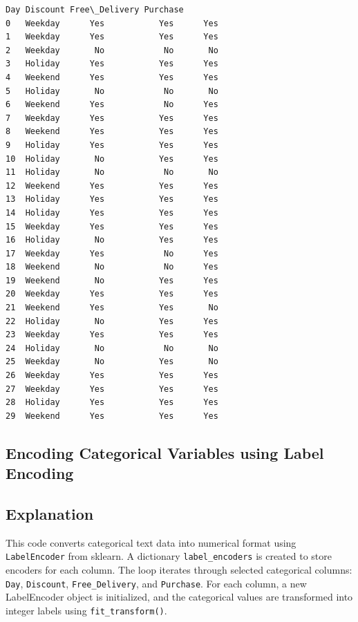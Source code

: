 \documentclass[11pt]{article}
\makeatletter
\newcommand{\boxspacing}{\kern\kvtcb@left@rule\kern\kvtcb@boxsep}
\newcommand{\prompt}[4]{
        {\ttfamily\llap{{\color{#2}[#3]:\hspace{3pt}#4}}\vspace{-\baselineskip}}
    }
\makeatother
\begin{document}
\begin{tcolorbox}[breakable, size=fbox, boxrule=.5pt, pad at break*=1mm, opacityfill=0]
\prompt{Out}{outcolor}{3}{\boxspacing}
\begin{Verbatim}[commandchars=\\\{\}]
        Day Discount Free\_Delivery Purchase
0   Weekday      Yes           Yes      Yes
1   Weekday      Yes           Yes      Yes
2   Weekday       No            No       No
3   Holiday      Yes           Yes      Yes
4   Weekend      Yes           Yes      Yes
5   Holiday       No            No       No
6   Weekend      Yes            No      Yes
7   Weekday      Yes           Yes      Yes
8   Weekend      Yes           Yes      Yes
9   Holiday      Yes           Yes      Yes
10  Holiday       No           Yes      Yes
11  Holiday       No            No       No
12  Weekend      Yes           Yes      Yes
13  Holiday      Yes           Yes      Yes
14  Holiday      Yes           Yes      Yes
15  Weekday      Yes           Yes      Yes
16  Holiday       No           Yes      Yes
17  Weekday      Yes            No      Yes
18  Weekend       No            No      Yes
19  Weekend       No           Yes      Yes
20  Weekday      Yes           Yes      Yes
21  Weekend      Yes           Yes       No
22  Holiday       No           Yes      Yes
23  Weekday      Yes           Yes      Yes
24  Holiday       No            No       No
25  Weekday       No           Yes       No
26  Weekday      Yes           Yes      Yes
27  Weekday      Yes           Yes      Yes
28  Holiday      Yes           Yes      Yes
29  Weekend      Yes           Yes      Yes
\end{Verbatim}
\end{tcolorbox}
        

\subsection{Encoding Categorical Variables using Label Encoding}

\subsection*{Explanation}
This code converts categorical text data into numerical format using \texttt{LabelEncoder} from sklearn. A dictionary \texttt{label\_encoders} is created to store encoders for each column. The loop iterates through selected categorical columns: \texttt{Day}, \texttt{Discount}, \texttt{Free\_Delivery}, and \texttt{Purchase}. For each column, a new LabelEncoder object is initialized, and the categorical values are transformed into integer labels using \texttt{fit\_transform()}.
        
\end{document}
